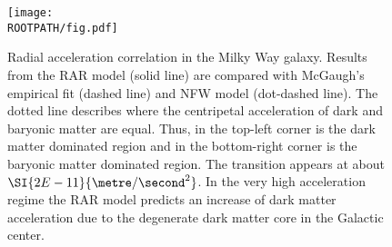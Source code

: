 \begin{figure}%
	\centering%
	\texttt{[image: \\ROOTPATH/fig.pdf]}%
	\caption{Radial acceleration correlation in the Milky Way galaxy. Results from the RAR model (solid line) are compared with McGaugh's empirical fit (dashed line) and NFW model (dot-dashed line). The dotted line describes where the centripetal acceleration of dark and baryonic matter are equal. Thus, in the top-left corner is the dark matter dominated region and in the bottom-right corner is the baryonic matter dominated region. The transition appears at about $\SI{2E-11}{\metre/\second^2}$. In the very high acceleration regime the RAR model predicts an increase of dark matter acceleration due to the degenerate dark matter core in the Galactic center.}%
\label{fig:mw-ac}
\end{figure}